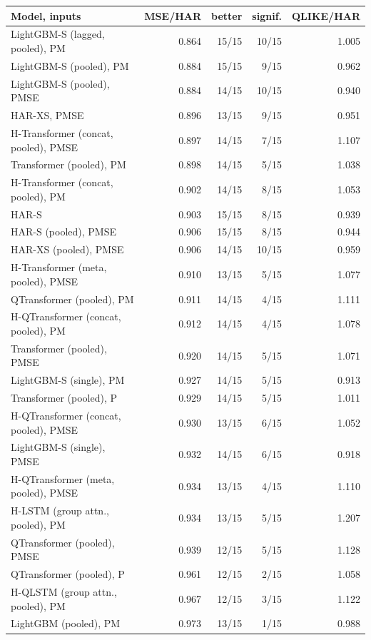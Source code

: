 \begin{tabular}{lrrrr}
\toprule
Model, inputs & MSE/HAR & better & signif. & QLIKE/HAR \\
\midrule
LightGBM-S (lagged, pooled), PM & 0.864 & 15/15 & 10/15 & 1.005 \\
LightGBM-S (pooled), PM & 0.884 & 15/15 & 9/15 & 0.962 \\
LightGBM-S (pooled), PMSE & 0.884 & 14/15 & 10/15 & 0.940 \\
HAR-XS, PMSE & 0.896 & 13/15 & 9/15 & 0.951 \\
H-Transformer (concat, pooled), PMSE & 0.897 & 14/15 & 7/15 & 1.107 \\
Transformer (pooled), PM & 0.898 & 14/15 & 5/15 & 1.038 \\
H-Transformer (concat, pooled), PM & 0.902 & 14/15 & 8/15 & 1.053 \\
HAR-S & 0.903 & 15/15 & 8/15 & 0.939 \\
HAR-S (pooled), PMSE & 0.906 & 15/15 & 8/15 & 0.944 \\
HAR-XS (pooled), PMSE & 0.906 & 14/15 & 10/15 & 0.959 \\
H-Transformer (meta, pooled), PMSE & 0.910 & 13/15 & 5/15 & 1.077 \\
QTransformer (pooled), PM & 0.911 & 14/15 & 4/15 & 1.111 \\
H-QTransformer (concat, pooled), PM & 0.912 & 14/15 & 4/15 & 1.078 \\
Transformer (pooled), PMSE & 0.920 & 14/15 & 5/15 & 1.071 \\
LightGBM-S (single), PM & 0.927 & 14/15 & 5/15 & 0.913 \\
Transformer (pooled), P & 0.929 & 14/15 & 5/15 & 1.011 \\
H-QTransformer (concat, pooled), PMSE & 0.930 & 13/15 & 6/15 & 1.052 \\
LightGBM-S (single), PMSE & 0.932 & 14/15 & 6/15 & 0.918 \\
H-QTransformer (meta, pooled), PMSE & 0.934 & 13/15 & 4/15 & 1.110 \\
H-LSTM (group attn., pooled), PM & 0.934 & 13/15 & 5/15 & 1.207 \\
QTransformer (pooled), PMSE & 0.939 & 12/15 & 5/15 & 1.128 \\
QTransformer (pooled), P & 0.961 & 12/15 & 2/15 & 1.058 \\
H-QLSTM (group attn., pooled), PM & 0.967 & 12/15 & 3/15 & 1.122 \\
LightGBM (pooled), PM & 0.973 & 13/15 & 1/15 & 0.988 \\

\end{tabular}
